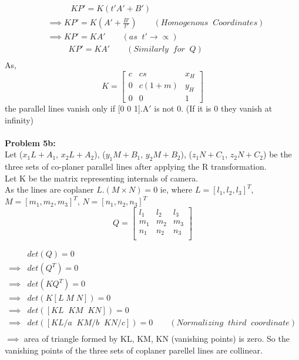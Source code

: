 \documentclass[a4paper]{article}
\begin{document}
\begin{equation*}
\begin{split}
& \;\;\;\qquad KP' = K(t'A'+B')\\
&\implies KP' = K(A'+\frac{B'}{t'}) \qquad (Homogenous\;\; Coordinates)\\ 
&\implies KP' = KA' \qquad (as \;\;t'\rightarrow\varpropto)\\
&\qquad \;\; KP' = KA' \qquad (Similarly\;\; for\;\; Q)\\
\end{split}
\end{equation*}
As, 
\[
K=
\begin{bmatrix}
    c       & cs & x_{H}  \\
    0       & c(1+m) & y_{H}  \\
    0       & 0 & 1
\end{bmatrix}
\]
the parallel lines vanish only if [0 0 1].A$'$ is not 0. (If it is 0 they vanish at infinity)\\ \\
\textbf{Problem 5b:}\\
Let ($x_1L+A_1$, $x_2L+A_2$), ($y_1M+B_1$, $y_2M+B_2$), ($z_1N+C_1$, $z_2N+C_2$) be the three sets of co-planer parallel lines after applying the R transformation.\\
Let K be the matrix representing internals of camera.\\
As the lines are coplaner $L.(M \times N) = 0 $  ie, where $L = [l_1,l_2,l_3]^T$, $M = [m_1,m_2,m_3]^T$, $N = [n_1,n_2,n_3]^T$
\[
Q=
\begin{bmatrix}
    l_1       & l_2 & l_3  \\
    m_1       & m_2 & m_3  \\
    n_1       & n_2 & n_3  \\
\end{bmatrix}
\]

\begin{equation*} 
\begin{split}
& det(Q) = 0 \\
\implies & det(Q^T)=0 \\
\implies & det(KQ^T)=0\\
\implies & det(K[L\; M\; N]) =0 \\
\implies & det([KL\;\; KM\;\; KN]) = 0\\
\implies & det([KL/a\;\; KM/b\;\; KN/c]) = 0 \qquad (Normalizing\;\; third \;\;coordinate)\\
\end{split}
\end{equation*}
$\implies$ area of triangle formed by KL, KM, KN (vanishing points) is zero. So the vanishing points of the three sets of coplaner parellel lines are collinear. 
\end{document}
